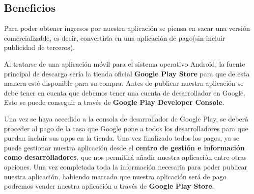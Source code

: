 \subsection{Beneficios}
Para poder obtener ingresos por nuestra aplicación se piensa en sacar una versión comercializable, es decir, convertirla en una aplicación de pago(sin incluir publicidad de terceros).

Al tratarse de una aplicación móvil para el sistema operativo Android, la fuente principal de descarga sería la tienda oficial \textbf{Google Play Store} para que de esta manera esté disponible para su compra.
Antes de publicar nuestra aplicación se debe tener en cuenta que debemos tener una cuenta de desarrollador en Google. Esto se puede conseguir a través de \textbf{Google Play Developer Console}.

Una vez se haya accedido a la consola de desarrollador de Google Play, se deberá proceder al pago de la tasa que Google pone a todos los desarrolladores para que puedan incluir sus apps en la tienda.
Una vez finalizado todos los pagos, ya se puede gestionar nuestra aplicación desde el \textbf{centro de gestión e información como desarrolladores}, que nos permitirá añadir nuestra aplicación entre otras opciones. Una vez completada toda la información necesaria para poder publicar nuestra aplicación, habiendo marcado que nuestra aplicación será de pago podremos vender nuestra aplicación a través de \textbf{Google Play Store}.

